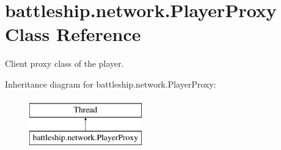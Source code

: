 \hypertarget{classbattleship_1_1network_1_1PlayerProxy}{}\section{battleship.\+network.\+Player\+Proxy Class Reference}
\label{classbattleship_1_1network_1_1PlayerProxy}


Client proxy class of the player.  


Inheritance diagram for battleship.\+network.\+Player\+Proxy\+:\begin{figure}[H]
\begin{center}
\leavevmode
\includegraphics[height=2.000000cm]{classbattleship_1_1network_1_1PlayerProxy}
\end{center}
\end{figure}
